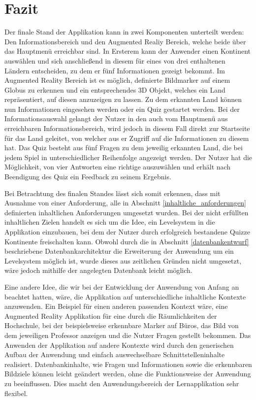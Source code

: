 \chapter{Fazit}\label{ch:fazit}
Der finale Stand der Applikation kann in zwei Komponenten unterteilt werden: Den Informationsbereich und den Augmented Realiy Bereich, welche beide über das Hauptmenü erreichbar sind.
In Ersterem kann der Anwender einen Kontinent auswählen und sich anschließend in diesem für eines von drei enthaltenen Ländern entscheiden, zu dem er fünf Informationen gezeigt bekommt.
Im Augmented Reality Bereich ist es möglich, definierte Bildmarker auf einem Globus zu erkennen und ein entsprechendes 3D Objekt, welches ein Land repräsentiert, auf diesen anzuzeigen zu lassen.
Zu dem erkannten Land können nun Informationen eingesehen werden oder ein Quiz gestartet werden. 
Bei der Informationsauswahl gelangt der Nutzer in den auch vom Hauptmenü aus erreichbaren Informationsbereich, wird jedoch in diesem Fall direkt zur Startseite für das Land geleitet, von welcher aus er Zugriff auf die Informationen zu diesem hat.
Das Quiz besteht aus fünf Fragen zu dem jeweilig erkannten Land, die bei jedem Spiel in unterschiedlicher Reihenfolge angezeigt werden.
Der Nutzer hat die Möglichkeit, von vier Antworten eine richtige auszuwählen und erhält nach Beendigung des Quiz ein Feedback zu seinem Ergebnis.

Bei Betrachtung des finalen Standes lässt sich somit erkennen, dass mit Ausnahme von einer Anforderung, alle in Abschnitt \ref{inhaltliche_anforderungen} definierten inhaltlichen Anforderungen umgesetzt wurden.
Bei der nicht erfüllten inhaltlichen Zielen handelt es sich um die Idee, ein Levelsystem in die Applikation einzubauen, bei dem der Nutzer durch erfolgreich bestandene Quizze Kontinente freischalten kann.
Obwohl durch die in Abschnitt \ref{datenbankentwurf} beschriebene Datenbankarchitektur die Erweiterung der Anwendung um ein Levelsystem möglich ist, wurde dieses aus zeitlichen Gründen nicht umgesetzt, wäre jedoch mithilfe der angelegten Datenbank leicht möglich.

Eine andere Idee, die wir bei der Entwicklung der Anwendung von Anfang an beachtet hatten, wäre, die Applikation auf unterschiedliche inhaltliche Kontexte anzuwenden.
Ein Beispiel für einen anderen passenden Kontext wäre, eine Augmented Reality Applikation für eine  durch die Räumlichkeiten der Hochschule, bei der beispielsweise erkennbare Marker auf Büros, das Bild von dem jeweiligen Professor anzeigen und die Nutzer Fragen gestellt bekommen.
Das Anwenden der Applikation auf andere Kontexte wird durch den generischen Aufbau der Anwendung und einfach auswechselbare Schnittstelleninhalte realisiert.
Datenbankinhalte, wie Fragen und Informationen sowie die erkennbaren Bildziele können leicht geändert werden, ohne die Funktionsweise der Anwendung zu beeinflussen. Dies macht den Anwendungsbereich der Lernapplikation sehr flexibel.

